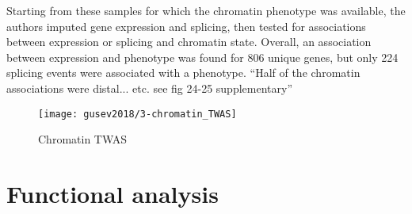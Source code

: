 \documentclass[../main.tex]{subfiles}
\begin{document}
Starting from these samples for which the chromatin phenotype was 
available, the authors imputed gene expression and splicing, then tested 
for associations between expression or splicing and chromatin state. 
Overall, an association between expression and phenotype was found for 
806 unique genes, but only 224 splicing events were associated with a 
	phenotype. \enquote{Half of the chromatin associations were 
distal... etc. see fig 24-25 supplementary}

\begin{figure}
	\texttt{[image: gusev2018/3-chromatin\_TWAS]}
	\caption{Chromatin TWAS}
\end{figure}

\section{Functional analysis}
\end{document}
